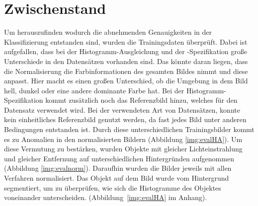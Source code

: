 \section{Zwischenstand}
Um herauszufinden wodurch die abnehmenden Genauigkeiten in der Klassifizierung entstanden sind, wurden die Trainingsdaten überprüft. Dabei ist aufgefallen, dass bei der Histogramm-Ausgleichung und der -Spezifikation große Unterschiede in den Datensätzen vorhanden sind. Das könnte daran liegen, dass die Normalisierung die Farbinformationen des gesamten Bildes nimmt und diese anpasst. Hier macht es einen großen Unterschied, ob die Umgebung in dem Bild hell, dunkel oder eine andere dominante Farbe hat. Bei der Histogramm-Spezifikation kommt zusätzlich noch das Referenzbild hinzu, welches für den Datensatz verwendet wird. Bei der verwendeten Art von Datensätzen, konnte kein einheitliches Referenzbild genutzt werden, da fast jedes Bild unter anderen Bedingungen entstanden ist. Durch diese unterschiedlichen Trainingsbilder kommt es zu Anomalien in den normalisierten Bildern (Abbildung \ref{img:evalHA}). Um diese Vermutung zu bestärken, wurden Objekte mit gleicher Lichteinstrahlung und gleicher Entfernung auf unterschiedlichen Hintergründen aufgenommen (Abbildung \ref{img:evalnorm}). Daraufhin wurden die Bilder jeweils mit allen Verfahren normalisiert. Das Objekt auf dem Bild wurde vom Hintergrund segmentiert, um zu überprüfen, wie sich die Histogramme des Objektes voneinander unterscheiden. (Abbildung~\ref{img:evalHA} im Anhang).\\
